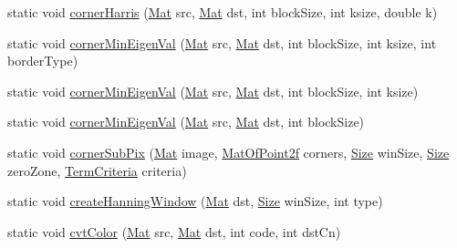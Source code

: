 \begin{DoxyCompactItemize}
\item 
static void \mbox{\hyperlink{classorg_1_1opencv_1_1imgproc_1_1_imgproc_a86dc26104d7f6287e2f4eef9379542c4}{corner\+Harris}} (\mbox{\hyperlink{classorg_1_1opencv_1_1core_1_1_mat}{Mat}} src, \mbox{\hyperlink{classorg_1_1opencv_1_1core_1_1_mat}{Mat}} dst, int block\+Size, int ksize, double k)
\item 
static void \mbox{\hyperlink{classorg_1_1opencv_1_1imgproc_1_1_imgproc_a9a5a2f96d413cc9f1ce919942a150a41}{corner\+Min\+Eigen\+Val}} (\mbox{\hyperlink{classorg_1_1opencv_1_1core_1_1_mat}{Mat}} src, \mbox{\hyperlink{classorg_1_1opencv_1_1core_1_1_mat}{Mat}} dst, int block\+Size, int ksize, int border\+Type)
\item 
static void \mbox{\hyperlink{classorg_1_1opencv_1_1imgproc_1_1_imgproc_a7a680b6cb84ba84e1a6bbc6bfc121374}{corner\+Min\+Eigen\+Val}} (\mbox{\hyperlink{classorg_1_1opencv_1_1core_1_1_mat}{Mat}} src, \mbox{\hyperlink{classorg_1_1opencv_1_1core_1_1_mat}{Mat}} dst, int block\+Size, int ksize)
\item 
static void \mbox{\hyperlink{classorg_1_1opencv_1_1imgproc_1_1_imgproc_aa8d64df7e315470530c31aca691bf1d1}{corner\+Min\+Eigen\+Val}} (\mbox{\hyperlink{classorg_1_1opencv_1_1core_1_1_mat}{Mat}} src, \mbox{\hyperlink{classorg_1_1opencv_1_1core_1_1_mat}{Mat}} dst, int block\+Size)
\item 
static void \mbox{\hyperlink{classorg_1_1opencv_1_1imgproc_1_1_imgproc_a27d2a87eb126da8ffaf0ef12950a5b48}{corner\+Sub\+Pix}} (\mbox{\hyperlink{classorg_1_1opencv_1_1core_1_1_mat}{Mat}} image, \mbox{\hyperlink{classorg_1_1opencv_1_1core_1_1_mat_of_point2f}{Mat\+Of\+Point2f}} corners, \mbox{\hyperlink{classorg_1_1opencv_1_1core_1_1_size}{Size}} win\+Size, \mbox{\hyperlink{classorg_1_1opencv_1_1core_1_1_size}{Size}} zero\+Zone, \mbox{\hyperlink{classorg_1_1opencv_1_1core_1_1_term_criteria}{Term\+Criteria}} criteria)
\item 
static void \mbox{\hyperlink{classorg_1_1opencv_1_1imgproc_1_1_imgproc_a8953a925c05f058b4b992831fea01eee}{create\+Hanning\+Window}} (\mbox{\hyperlink{classorg_1_1opencv_1_1core_1_1_mat}{Mat}} dst, \mbox{\hyperlink{classorg_1_1opencv_1_1core_1_1_size}{Size}} win\+Size, int type)
\item 
static void \mbox{\hyperlink{classorg_1_1opencv_1_1imgproc_1_1_imgproc_ab8fb70fea379b4215a77122d698d860d}{cvt\+Color}} (\mbox{\hyperlink{classorg_1_1opencv_1_1core_1_1_mat}{Mat}} src, \mbox{\hyperlink{classorg_1_1opencv_1_1core_1_1_mat}{Mat}} dst, int code, int dst\+Cn)
\item 

\end{DoxyCompactItemize}
